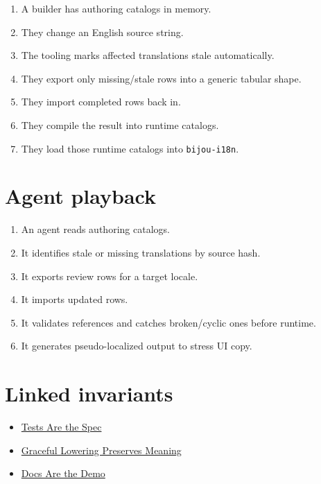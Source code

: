 \begin{enumerate}
\def\labelenumi{\arabic{enumi}.}
\tightlist
\item
  A builder has authoring catalogs in memory.
\item
  They change an English source string.
\item
  The tooling marks affected translations stale automatically.
\item
  They export only missing/stale rows into a generic tabular shape.
\item
  They import completed rows back in.
\item
  They compile the result into runtime catalogs.
\item
  They load those runtime catalogs into \texttt{b\allowbreak{}i\allowbreak{}j\allowbreak{}o\allowbreak{}u\allowbreak{}-\allowbreak{}i\allowbreak{}1\allowbreak{}8\allowbreak{}n}.
\end{enumerate}

\section{Agent playback}\label{record-189-agent-playback}

\begin{enumerate}
\def\labelenumi{\arabic{enumi}.}
\tightlist
\item
  An agent reads authoring catalogs.
\item
  It identifies stale or missing translations by source hash.
\item
  It exports review rows for a target locale.
\item
  It imports updated rows.
\item
  It validates references and catches broken/cyclic ones before runtime.
\item
  It generates pseudo-localized output to stress UI copy.
\end{enumerate}

\section{Linked invariants}\label{record-189-linked-invariants}

\begin{itemize}
\tightlist
\item
  \href{https://github.com/flyingrobots/bijou/blob/cbd70612140e7a450d764b3c7be1c6af878b99bc/docs/invariants/tests-are-the-spec.md}{Tests Are the Spec}
\item
  \href{https://github.com/flyingrobots/bijou/blob/cbd70612140e7a450d764b3c7be1c6af878b99bc/docs/invariants/graceful-lowering-preserves-meaning.md}{Graceful Lowering Preserves Meaning}
\item
  \href{https://github.com/flyingrobots/bijou/blob/cbd70612140e7a450d764b3c7be1c6af878b99bc/docs/invariants/docs-are-the-demo.md}{Docs Are the Demo}
\end{itemize}

